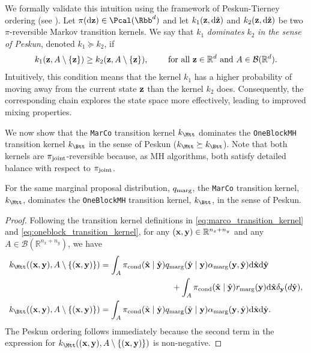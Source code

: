 \documentclass[onefignum,onetabnum]{siamonline250211}
\renewcommand{\d} {{\rm d}}                                %
\newcommand{\bfx}{{\bf x}}
\newcommand{\bfy}{{\bf y}}
\newcommand{\bfz}{{\bf z}}
\newcommand{\nx}{{n_{x}}}
\newcommand{\ny}{{n_{y}}}
\newcommand{\pjoint}{\pi_{\rm joint}}
\newcommand{\pcond}{\pi_{\rm cond}}
\newcommand{\MarCo}{\textnormal{\texttt{MarCo}}\xspace}
\newcommand{\OneblockMCMC}{\textnormal{\texttt{OneBlockMH}}\xspace}
\begin{document}
%
%

%
%

%
%
%
%
%

We formally validate this intuition using the framework of Peskun-Tierney ordering (see \cite{peskun_optimum_1973, tierney_note_1998, mira_ordering_2001, andrieu_peskuntierney_2021, andrieu_establishing_2016}). Let $\pi(\d\bfz)\in \Pcal(\Rbb^d)$ and let $k_1(\bfz,\d\hat\bfz)$ and $k_2(\bfz,\d\hat\bfz)$ be two $\pi$-reversible Markov transition kernels. We say that $k_1$ \textit{dominates} $k_2$ \textit{in the sense of Peskun}, denoted $k_1 \succeq k_2$, if
\begin{equation*}
    k_1(\bfz,A\setminus \{\bfz\}) \ge k_2(\bfz,A\setminus \{\bfz\}),\qquad\text{ for all }\bfz\in\mathbb{R}^d \text{ and } A\in\mathcal{B}(\mathbb{R}^d).
\end{equation*}
Intuitively, this condition means that the kernel $k_1$ has a higher probability of moving away from the current state $\bfz$ than the kernel $k_2$ does. Consequently, the corresponding chain explores the state space more effectively, leading to improved mixing properties.

We now show that the \MarCo transition kernel $k_{\Mtt}$ dominates the \OneblockMCMC transition kernel $k_{\Btt}$ in the sense of Peskun ($k_{\Mtt}\succeq k_{\Btt}$). Note that both  kernels are $\pjoint$-reversible because, as MH algorithms, both satisfy detailed balance with respect to $\pjoint$.


\begin{proposition}
\label{prop:Peskun_ordering_M_B}
    For the same marginal proposal distribution, $q_{\rm marg}$, 
    the \MarCo transition kernel, $k_{\Mtt}$, dominates the \OneblockMCMC transition kernel, $k_{\Btt}$, in the sense of Peskun.
\end{proposition}

\begin{proof}

    Following the transition kernel definitions in \eqref{eq:marco_transition_kernel} and \eqref{eq:oneblock_transition_kernel},  for any $(\bfx,\bfy)\in\mathbb{R}^{\nx+\ny}$ and any $A\in\mathcal{B}(\mathbb{R}^{\nx+\ny})$, we have
    \begin{align*}
        k_{\Mtt}((\bfx,\bfy),A\setminus\{(\bfx,\bfy)\})&=\int_A \pcond(\hat\bfx\mid\hat\bfy)q_{\rm marg}(\hat\bfy\mid\bfy)\alpha_{\rm marg}(\bfy,\hat\bfy)\d\hat\bfx \d\hat\bfy \\
        &\hspace{3cm}+ \int_A \pcond(\hat\bfx\mid\hat\bfy)r_{\rm marg}(\bfy)\d\hat\bfx\delta_{\bfy}(d\hat\bfy),\\
        k_{\Btt}((\bfx,\bfy),A\setminus\{(\bfx,\bfy)\})&=\int_A \pcond(\hat\bfx\mid\hat\bfy)q_{\rm marg}(\hat\bfy\mid\bfy)\alpha_{\rm marg}(\bfy,\hat\bfy)\d\hat\bfx \d\hat\bfy.
    \end{align*}
    The Peskun ordering follows immediately because the second term in the expression for $ k_{\Mtt}((\bfx,\bfy),A\setminus\{(\bfx,\bfy)\})$ is non-negative.
\end{proof}
\end{document}
